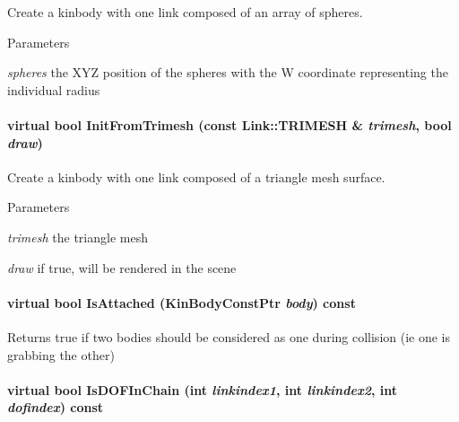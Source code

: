 Create a kinbody with one link composed of an array of spheres. 


\begin{DoxyParams}{Parameters}
\item[{\em spheres}]the XYZ position of the spheres with the W coordinate representing the individual radius \end{DoxyParams}
\hypertarget{classOpenRAVE_1_1KinBody_a9fbe9cf06cf411d8e93431552bdd4ebf}{
\paragraph[{InitFromTrimesh}]{\setlength{\rightskip}{0pt plus 5cm}virtual bool InitFromTrimesh (const {\bf Link::TRIMESH} \& {\em trimesh}, \/  bool {\em draw})}\hfill}
\label{classOpenRAVE_1_1KinBody_a9fbe9cf06cf411d8e93431552bdd4ebf}


Create a kinbody with one link composed of a triangle mesh surface. 


\begin{DoxyParams}{Parameters}
\item[{\em trimesh}]the triangle mesh \item[{\em draw}]if true, will be rendered in the scene \end{DoxyParams}
\hypertarget{classOpenRAVE_1_1KinBody_a1e6636e58d5b763c37a529f752c5012d}{
\paragraph[{IsAttached}]{\setlength{\rightskip}{0pt plus 5cm}virtual bool IsAttached (KinBodyConstPtr {\em body}) const}\hfill}
\label{classOpenRAVE_1_1KinBody_a1e6636e58d5b763c37a529f752c5012d}
\begin{DoxyReturn}{Returns}
true if two bodies should be considered as one during collision (ie one is grabbing the other) 
\end{DoxyReturn}
\hypertarget{classOpenRAVE_1_1KinBody_a0367d00b79b29dae5c647b169432b2a9}{
\paragraph[{IsDOFInChain}]{\setlength{\rightskip}{0pt plus 5cm}virtual bool IsDOFInChain (int {\em linkindex1}, \/  int {\em linkindex2}, \/  int {\em dofindex}) const}\hfill}
\label{classOpenRAVE_1_1KinBody_a0367d00b79b29dae5c647b169432b2a9}


